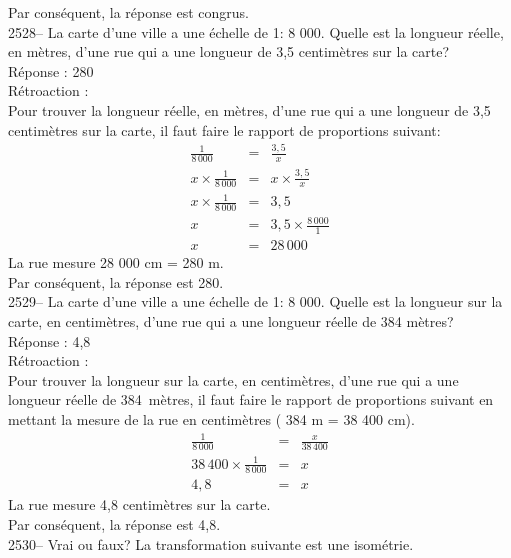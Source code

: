 \documentclass[letterpaper, 12pt]{article}
\begin{document}
Par cons\'equent, la r\'eponse est congrus.\\

2528-- La carte d'une ville a une \'echelle de 1: 8 000. Quelle est la longueur r\'eelle, en m\`etres, d'une rue qui a une longueur de 3,5 centim\`etres sur la carte?\\

R\'eponse : 280\\

R\'etroaction :\\
Pour trouver la longueur r\'eelle, en m\`etres, d'une rue qui a une longueur de 3,5 centim\`etres sur la carte, il faut faire le rapport de proportions suivant:
\begin{eqnarray*}
 \frac{1}{8\,000}&=&\frac{3,5}{x}\\[2mm]
x \times \frac{1}{8\,000}&=&x \times \frac{3,5}{x}\\[2mm]
x \times \frac{1}{8\,000}&=&3,5\\[2mm]
x &=&3,5\times \frac{8\,000}{1}\\[2mm]
x &=&28\,000
\end{eqnarray*}
La rue mesure 28 000 cm = 280 m.\\
Par cons\'equent, la r\'eponse est 280.\\

2529--   La carte d'une ville a une \'echelle de 1: 8 000. Quelle est la longueur sur la carte, en centim\`etres, d'une rue qui a une longueur r\'eelle de 384 m\`etres?\\

R\'eponse : 4,8\\

R\'etroaction :\\
Pour trouver la longueur sur la carte, en centim\`etres, d'une rue qui a une longueur r\'eelle de \mbox{384 m\`etres}, il faut faire le rapport de proportions suivant en mettant la mesure de la rue en centim\`etres ( 384 m = 38 400 cm).
\begin{eqnarray*}
 \frac{1}{8\,000}&=&\frac{x}{38\,400}\\[2mm]
38\,400 \times \frac{1}{8\,000}&=&x\\[2mm]
4,8&=&x
\end{eqnarray*}
La rue mesure 4,8 centim\`etres sur la carte.\\
Par cons\'equent, la r\'eponse est 4,8.\\

2530-- Vrai ou faux? La transformation suivante est une isom\'etrie.\\
\end{document}
